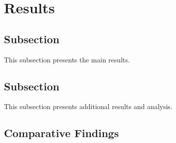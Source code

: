 \section{Results}

\subsection{Subsection}
This subsection presents the main results.

\lipsum[40-44]


\subsection{Subsection}
This subsection presents additional results and analysis.

\lipsum[45-48]

\subsection{Comparative Findings}
\lipsum[49-52]

